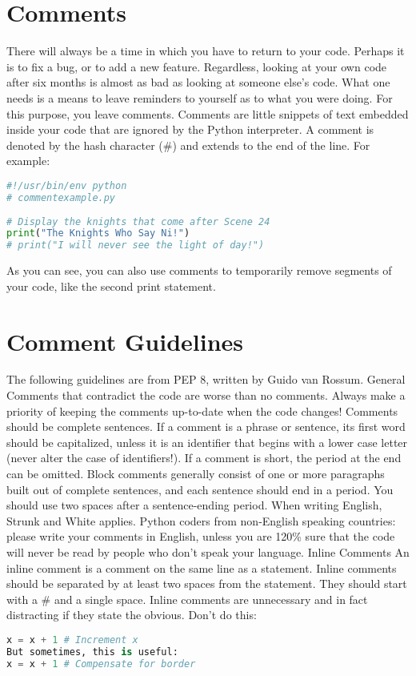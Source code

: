 \section{Comments}
There will always be a time in which you have to return to your code. Perhaps it
is to fix a bug, or to add a new feature. Regardless, looking at your own code
after six months is almost as bad as looking at someone else's code. What one
needs is a means to leave reminders to yourself as to what you were doing.  For
this purpose, you leave comments. Comments are little snippets of text embedded
inside your code that are ignored by the Python interpreter. A comment is
denoted by the hash character (\#) and extends to the end of the line. For
example:
\lstset{basicstyle=\scriptsize, numbers=left, captionpos=b, tabsize=4}
\begin{lstlisting}[caption=Basic Comment,language={Python},
xleftmargin=15pt, label=lst:basiccomment]
#!/usr/bin/env python
# commentexample.py
 
# Display the knights that come after Scene 24
print("The Knights Who Say Ni!")
# print("I will never see the light of day!")
\end{lstlisting}

As you can see, you can also use comments to temporarily remove segments of your
code, like the second print statement.

\section{Comment Guidelines}
The following guidelines are from PEP 8, written by Guido van Rossum.  General
Comments that contradict the code are worse than no comments. Always make a
priority of keeping the comments up-to-date when the code changes!  Comments
should be complete sentences. If a comment is a phrase or sentence, its first
word should be capitalized, unless it is an identifier that begins with a lower
case letter (never alter the case of identifiers!).  If a comment is short, the
period at the end can be omitted. Block comments generally consist of one or
more paragraphs built out of complete sentences, and each sentence should end in
a period.  You should use two spaces after a sentence-ending period.  When
writing English, Strunk and White applies.  Python coders from non-English
speaking countries: please write your comments in English, unless you are 120\%
sure that the code will never be read by people who don't speak your language.
Inline Comments An inline comment is a comment on the same line as a statement.
Inline comments should be separated by at least two spaces from the statement.
They should start with a \# and a single space.  Inline comments are unnecessary
and in fact distracting if they state the obvious. Don't do this:
\lstset{basicstyle=\scriptsize, numbers=left, captionpos=b, tabsize=4}
\begin{lstlisting}[caption=End of Line Comment,language={Python},
xleftmargin=15pt, label=lst:dndoflinecomment]
x = x + 1 # Increment x
But sometimes, this is useful:
x = x + 1 # Compensate for border
\end{lstlisting}

